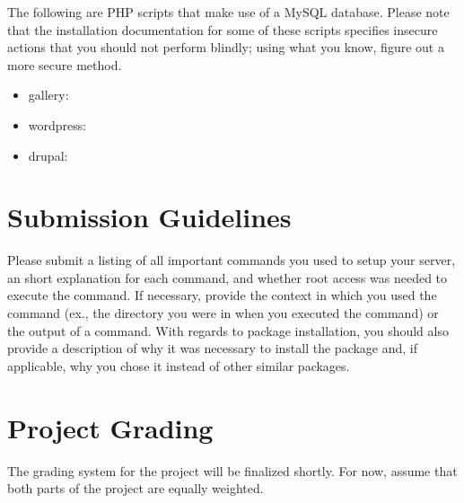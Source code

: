 \documentclass[10pt]{article}
\begin{document}
The following are PHP scripts that make use of a MySQL database. Please note that the installation documentation for some of these scripts specifies insecure actions that you should not perform blindly; using what you know, figure out a more secure method.

\begin{itemize}
\item gallery: 
\item wordpress: 
\item drupal: 
\end{itemize}

\section{Submission Guidelines }
Please submit a listing of all important commands you used to setup your server, an short explanation for each command, and whether root access was needed to execute the command. If necessary, provide the context in which you used the command (ex., the directory you were in when you executed the command) or the output of a command.  With regards to package installation, you should also provide a description of why it was necessary to install the package and, if applicable, why you chose it instead of other similar packages. 
\section{Project Grading}
The grading system for the project will be finalized shortly. For now, assume that both parts of the project are equally weighted.
\end{document}
